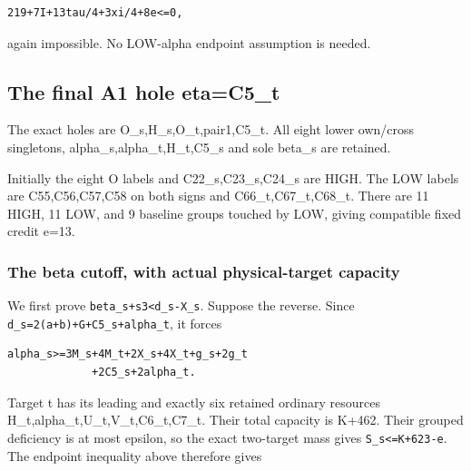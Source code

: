 \documentclass[10pt,a4paper]{article}
\theoremstyle{definition}
\begin{document}
\begin{lstlisting}
219+7I+13tau/4+3xi/4+8e<=0,
\end{lstlisting}

again impossible. No LOW-alpha endpoint assumption is needed.

\hypertarget{the-final-a1-hole-etac5_t}{%
\subsection{The final A1 hole
eta=\allowbreak{}C5\_\allowbreak{}t}\label{the-final-a1-hole-etac5_t}}

The exact holes are O\_\allowbreak{}s,\allowbreak{}H\_\allowbreak{}s,\allowbreak{}O\_\allowbreak{}t,\allowbreak{}pair1,\allowbreak{}C5\_\allowbreak{}t. All eight lower
own/cross singletons,\allowbreak{} alpha\_\allowbreak{}s,\allowbreak{}alpha\_\allowbreak{}t,\allowbreak{}H\_\allowbreak{}t,\allowbreak{}C5\_\allowbreak{}s and sole beta\_\allowbreak{}s are
retained.

Initially the eight O labels and C22\_\allowbreak{}s,\allowbreak{}C23\_\allowbreak{}s,\allowbreak{}C24\_\allowbreak{}s are HIGH. The LOW
labels are C55,\allowbreak{}C56,\allowbreak{}C57,\allowbreak{}C58 on both signs and C66\_\allowbreak{}t,\allowbreak{}C67\_\allowbreak{}t,\allowbreak{}C68\_\allowbreak{}t. There
are 11 HIGH,\allowbreak{} 11 LOW,\allowbreak{} and 9 baseline groups touched by LOW,\allowbreak{} giving
compatible fixed credit e=\allowbreak{}13.

\hypertarget{the-beta-cutoff-with-actual-physical-target-capacity}{%
\subsubsection{The beta cutoff,\allowbreak{} with actual physical-target
capacity}\label{the-beta-cutoff-with-actual-physical-target-capacity}}

We first prove \texttt{beta\_\allowbreak{}\allowbreak{}s+\allowbreak{}s3<d\_\allowbreak{}\allowbreak{}s-X\_\allowbreak{}\allowbreak{}s}. Suppose
the reverse. Since
\texttt{d\_\allowbreak{}\allowbreak{}s=\allowbreak{}2(a+\allowbreak{}b)+\allowbreak{}G+\allowbreak{}C5\_\allowbreak{}\allowbreak{}s+\allowbreak{}alpha\_\allowbreak{}\allowbreak{}t},\allowbreak{} it forces

\begin{lstlisting}
alpha_s>=3M_s+4M_t+2X_s+4X_t+g_s+2g_t
             +2C5_s+2alpha_t.
\end{lstlisting}

Target t has its leading and exactly six retained ordinary resources
H\_\allowbreak{}t,\allowbreak{}alpha\_\allowbreak{}t,\allowbreak{}U\_\allowbreak{}t,\allowbreak{}V\_\allowbreak{}t,\allowbreak{}C6\_\allowbreak{}t,\allowbreak{}C7\_\allowbreak{}t. Their total capacity is K+\allowbreak{}462.
Their grouped deficiency is at most epsilon,\allowbreak{} so the exact two-target
mass gives \texttt{S\_\allowbreak{}\allowbreak{}s<=\allowbreak{}K+\allowbreak{}623-e}. The endpoint
inequality above therefore gives
\end{document}
